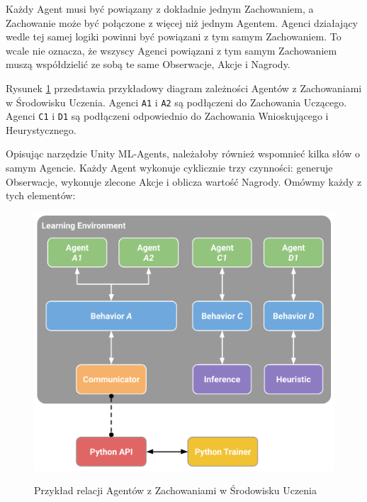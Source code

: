 Każdy Agent musi być powiązany z dokładnie jednym Zachowaniem, a Zachowanie może być połączone z więcej niż jednym Agentem. Agenci działający wedle tej samej logiki powinni być powiązani z tym samym Zachowaniem. To wcale nie oznacza, że wszyscy Agenci powiązani z tym samym Zachowaniem muszą współdzielić ze sobą te same Obserwacje, Akcje i Nagrody.

Rysunek \ref{UnityMlaExample} przedstawia przykładowy diagram zależności Agentów z Zachowaniami w Środowisku Uczenia. Agenci \texttt{A1} i \texttt{A2} są podłączeni do Zachowania Uczącego. Agenci \texttt{C1} i \texttt{D1} są podłączeni odpowiednio do Zachowania Wnioskującego i Heurystycznego.

Opisując narzędzie Unity ML-Agents, należałoby również wspomnieć kilka słów o samym Agencie. Każdy Agent wykonuje cyklicznie trzy czynności: generuje Obserwacje, wykonuje zlecone Akcje i oblicza wartość Nagrody. Omówmy każdy z tych elementów:

\newpage
\begin{figure}[h]
\begin{center}
\includegraphics[width=15cm]{resources/figures/learning_environment_example.png}
\caption{Przykład relacji Agentów z Zachowaniami w Środowisku Uczenia}
\label{UnityMlaExample}
\end{center}
\vspace{-1cm}
\end{figure}


